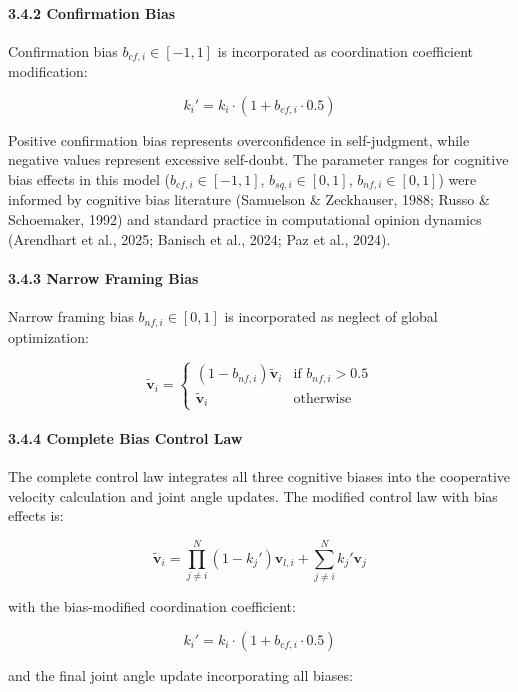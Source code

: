 \paragraph{3.4.2 Confirmation Bias}\label{confirmation-bias}

Confirmation bias \(b_{cf,i} \in [-1,1]\) is incorporated as
coordination coefficient modification:

\[k_i' = k_i \cdot (1 + b_{cf,i} \cdot 0.5)\]

Positive confirmation bias represents overconfidence in self-judgment,
while negative values represent excessive self-doubt. The parameter
ranges for cognitive bias effects in this model
(\(b_{cf,i} \in [-1,1]\), \(b_{sq,i} \in [0,1]\),
\(b_{nf,i} \in [0,1]\)) were informed by cognitive bias literature
(Samuelson \& Zeckhauser, 1988; Russo \& Schoemaker, 1992) and standard
practice in computational opinion dynamics (Arendhart et al., 2025;
Banisch et al., 2024; Paz et al., 2024).

\paragraph{3.4.3 Narrow Framing Bias}\label{narrow-framing-bias}

Narrow framing bias \(b_{nf,i} \in [0,1]\) is incorporated as neglect of
global optimization:

\[\tilde{\mathbf{v}}_i = \begin{cases}
(1 - b_{nf,i}) \tilde{\mathbf{v}}_i & \text{if } b_{nf,i} > 0.5 \\
\tilde{\mathbf{v}}_i & \text{otherwise}
\end{cases}\]

\paragraph{3.4.4 Complete Bias Control
Law}\label{complete-bias-control-law}

The complete control law integrates all three cognitive biases into the
cooperative velocity calculation and joint angle updates. The modified
control law with bias effects is:

\[\tilde{\mathbf{v}}_i = \prod_{j \neq i}^{N} (1 - k_j') \mathbf{v}_{l,i} + \sum_{j \neq i}^{N} k_j' \mathbf{v}_j\]

with the bias-modified coordination coefficient:

\[k_i' = k_i \cdot (1 + b_{cf,i} \cdot 0.5)\]

and the final joint angle update incorporating all biases:

